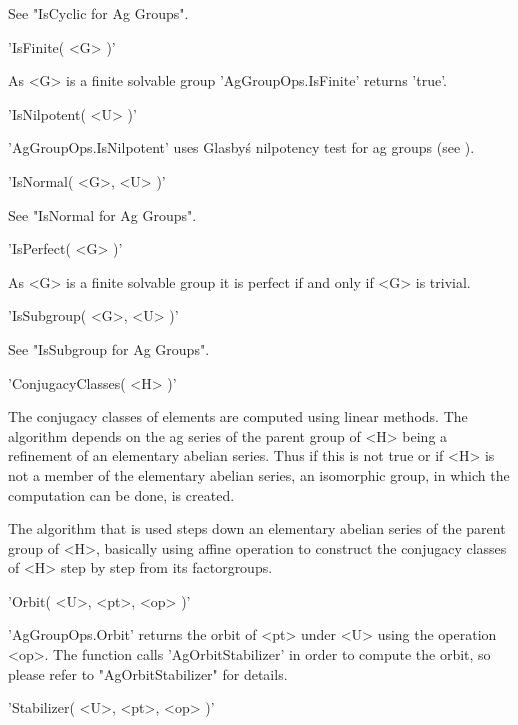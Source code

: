 See "IsCyclic for Ag Groups".

\vspace{5mm}
'IsFinite( <G> )'%

As <G> is a finite solvable group 'AgGroupOps.IsFinite' returns 'true'.

\vspace{5mm}
'IsNilpotent( <U> )'%

'AgGroupOps.IsNilpotent' uses Glasby\'s  nilpotency test   for ag  groups
(see \cite{Gla87}).

\vspace{5mm}
'IsNormal( <G>, <U> )'%

See "IsNormal for Ag Groups".

\vspace{5mm}
'IsPerfect( <G> )'%

As <G> is a finite  solvable group it  is  perfect if and only if  <G> is
trivial.

\vspace{5mm}
'IsSubgroup( <G>, <U> )'%

See "IsSubgroup for Ag Groups".

\vspace{5mm}
'ConjugacyClasses( <H> )'%

The conjugacy classes of elements are computed using linear methods.  The
algorithm depends on the ag  series  of the  parent group  of <H> being a
refinement of an  elementary abelian series. Thus if  this is not true or
if <H>  is not a member  of the elementary abelian series,  an isomorphic
group, in which the computation can be done, is created.

The algorithm that is used steps down an elementary abelian series of the
parent group  of <H>,  basically  using affine operation to construct the
conjugacy classes of <H> step by step from its factorgroups.

\vspace{5mm}
'Orbit( <U>, <pt>, <op> )'%

'AgGroupOps.Orbit' returns  the   orbit   of <pt> under <U>    using  the
operation <op>.    The function calls  'AgOrbitStabilizer'  in  order  to
compute the orbit, so please refer to "AgOrbitStabilizer" for details.

\vspace{5mm}
'Stabilizer( <U>, <pt>, <op> )'%

